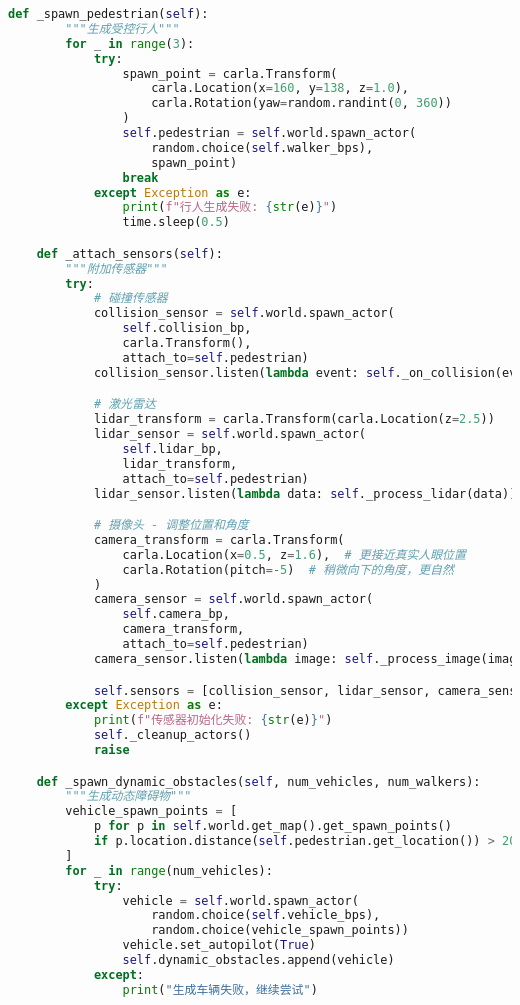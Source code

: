 \begin{lstlisting}[language=Python]
    def _spawn_pedestrian(self):
        """生成受控行人"""
        for _ in range(3):
            try:
                spawn_point = carla.Transform(
                    carla.Location(x=160, y=138, z=1.0),
                    carla.Rotation(yaw=random.randint(0, 360))
                )
                self.pedestrian = self.world.spawn_actor(
                    random.choice(self.walker_bps),
                    spawn_point)
                break
            except Exception as e:
                print(f"行人生成失败: {str(e)}")
                time.sleep(0.5)

    def _attach_sensors(self):
        """附加传感器"""
        try:
            # 碰撞传感器
            collision_sensor = self.world.spawn_actor(
                self.collision_bp,
                carla.Transform(),
                attach_to=self.pedestrian)
            collision_sensor.listen(lambda event: self._on_collision(event))

            # 激光雷达
            lidar_transform = carla.Transform(carla.Location(z=2.5))
            lidar_sensor = self.world.spawn_actor(
                self.lidar_bp,
                lidar_transform,
                attach_to=self.pedestrian)
            lidar_sensor.listen(lambda data: self._process_lidar(data))

            # 摄像头 - 调整位置和角度
            camera_transform = carla.Transform(
                carla.Location(x=0.5, z=1.6),  # 更接近真实人眼位置
                carla.Rotation(pitch=-5)  # 稍微向下的角度，更自然
            )
            camera_sensor = self.world.spawn_actor(
                self.camera_bp,
                camera_transform,
                attach_to=self.pedestrian)
            camera_sensor.listen(lambda image: self._process_image(image))

            self.sensors = [collision_sensor, lidar_sensor, camera_sensor]
        except Exception as e:
            print(f"传感器初始化失败: {str(e)}")
            self._cleanup_actors()
            raise

    def _spawn_dynamic_obstacles(self, num_vehicles, num_walkers):
        """生成动态障碍物"""
        vehicle_spawn_points = [
            p for p in self.world.get_map().get_spawn_points()
            if p.location.distance(self.pedestrian.get_location()) > 20.0
        ]
        for _ in range(num_vehicles):
            try:
                vehicle = self.world.spawn_actor(
                    random.choice(self.vehicle_bps),
                    random.choice(vehicle_spawn_points))
                vehicle.set_autopilot(True)
                self.dynamic_obstacles.append(vehicle)
            except:
                print("生成车辆失败，继续尝试")


\end{lstlisting}

